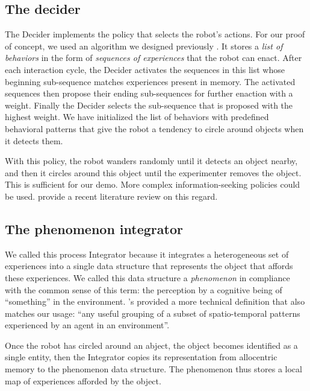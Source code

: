\documentclass[pmlr]{jmlr}%
\begin{document}
\subsection{The decider}
\label{sec:decider}

The Decider implements the policy that selects the robot's actions. 
For our proof of concept, we used an algorithm we designed previously \citep{georgeon_eca_2013}.
It stores a \textit{list of behaviors} in the form of \textit{sequences of experiences} that the robot can enact. 
After each interaction cycle, the Decider activates the sequences in this list whose beginning sub-sequence matches experiences present in memory. 
The activated sequences then propose their ending sub-sequences for further enaction with a weight. 
Finally the Decider selects the sub-sequence that is proposed with the highest weight. 
We have initialized the list of behaviors with predefined behavioral patterns that give the robot a tendency to circle around objects when it detects them. 

With this policy, the robot wanders randomly until it detects an object nearby, and then it circles around this object until the experimenter removes the object. 
This is sufficient for our demo. 
More complex information-seeking policies could be used. 
\cite{gottlieb_towards_2018} provide a recent literature review on this regard. 

\subsection{The phenomenon integrator}

We called this process Integrator because it integrates a heterogeneous set of experiences into a single data structure that represents the object that affords these experiences. 
We called this data structure a \textit{phenomenon} in compliance with the common sense of this term: the perception by a cognitive being of ``something'' in the environment.
\cite{thorisson_explanation_2021}'s provided a more technical definition that also matches our usage: ``any useful grouping of a subset of spatio-temporal patterns experienced by an agent in an environment''.


Once the robot has circled around an abject, the object becomes identified as a single entity, then the Integrator copies its representation from allocentric memory to the phenomenon data structure.
The phenomenon thus stores a local map of experiences afforded by the object. 
\end{document}
